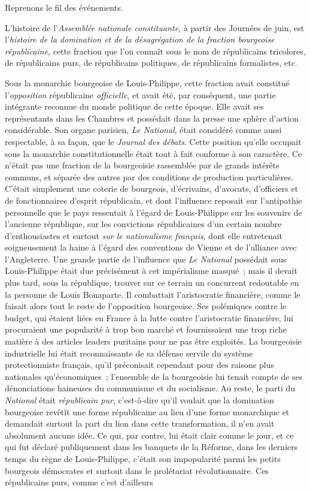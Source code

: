 \documentclass[french,twoside]{book} %
\newcommand\chaptercont{} %
\begin{document}
\chaptercont
\noindent Reprenons le fil des événements.\par
L’histoire de l’\emph{Assemblée nationale constituante}, à partir des Journées de juin, est l’\emph{histoire de la domination et de la désagrégation de la fraction bourgeoise républicaine}, cette fraction que l’on connaît sous le nom de républicains tricolores, de républicains purs, de républicains politiques, de républicains formalistes, etc.\par
Sous la monarchie bourgeoise de Louis-Philippe, cette fraction avait constitué l’\emph{opposition} républicaine \emph{officielle}, et avait été, par conséquent, une partie intégrante reconnue du monde politique de cette époque. Elle avait ses représentants dans les Chambres et possédait dans la presse une sphère d’action considérable. Son organe parisien, \emph{Le National}, était considéré comme aussi respectable, à sa façon, que le \emph{Journal des débats}. Cette position qu’elle occupait sous la monarchie constitutionnelle était tout à fait conforme à son caractère. Ce n’était pas une fraction de la bourgeoisie rassemblée par de grands intérêts communs, et séparée des autres par des conditions de production particulières. C’était simplement une coterie de bourgeois, d’écrivains, d’avocats, d’officiers et de fonctionnaires d’esprit républicain, et dont l’influence reposait sur l’antipathie personnelle que le pays ressentait à l’égard de Louis-Philippe sur les souvenirs de l’ancienne république, sur les convictions républicaines d’un certain nombre d’enthousiastes et surtout \emph{sur le nationalisme français}, dont elle entretenait soigneusement la haine à l’égard des conventions de Vienne et de l’alliance avec l’Angleterre. Une grande partie de l’influence que \emph{Le National} possédait sous Louis-Philippe était due précisément à cet impérialisme masqué ; mais il devait plus tard, sous la république, trouver sur ce terrain un concurrent redoutable en la personne de Louis Bonaparte. Il combattait l’aristocratie financière, comme le faisait alors tout le reste de l’opposition bourgeoise. Ses polémiques contre le budget, qui étaient liées en France à la lutte contre l’aristocratie financière, lui procuraient une popularité à trop bon marché et fournissaient une trop riche matière à des articles leaders puritains pour ne pas être exploités. La bourgeoisie industrielle lui était reconnaissante de sa défense servile du système protectionniste français, qu’il préconisait cependant pour des raisons plus nationales qu’économiques ; l’ensemble de la bourgeoisie lui tenait compte de ses dénonciations haineuses du communisme et du socialisme. Au reste, le parti du \emph{National} était \emph{républicain pur}, c’est-à-dire qu’il voulait que la domination bourgeoise revêtît une forme républicaine au lieu d’une forme monarchique et demandait surtout la part du lion dans cette transformation, il n’en avait absolument aucune idée. Ce qui, par contre, lui était clair comme le jour, et ce qui fut déclaré publiquement dans les banquets de la Réforme, dans les derniers temps du règne de Louis-Philippe, c’était son impopularité parmi les petits bourgeois démocrates et surtout dans le prolétariat révolutionnaire. Ces républicains purs, comme c’est d’ailleurs 
\end{document}
